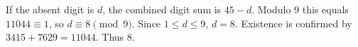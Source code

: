 If the absent digit is $d$, the combined digit sum is $45-d$. Modulo 9 this equals $11044\equiv1$, so $d\equiv8\pmod9$. Since $1\le d\le9$, $d=8$. Existence is confirmed by $3415+7629=11044$. Thus $\boxed8$.
